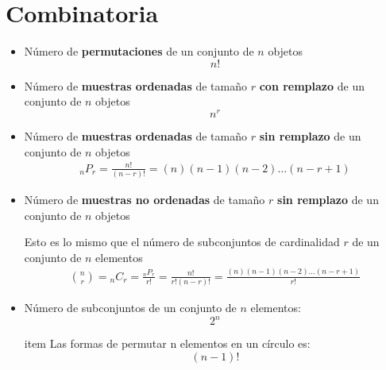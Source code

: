 \documentclass[12pt, fleqn]{report}                             %
\theoremstyle{break}                                            %
\begin{document}
        \section{Combinatoria}

            \begin{itemize}
                \item 
                    Número de \textbf{permutaciones} de un conjunto de $n$ objetos
                    \begin{equation*}
                        n!
                    \end{equation*}

                \item
                    Número de \textbf{muestras ordenadas} de tamaño $r$
                    \textbf{con remplazo} de un conjunto de $n$ objetos
                    \begin{equation*}
                        n^r
                    \end{equation*}

                \item
                    Número de \textbf{muestras ordenadas} de tamaño $r$
                    \textbf{sin remplazo} de un conjunto de $n$ objetos
                    \begin{align*}
                        {}_nP_r
                            = \frac{n!}{(n - r)!}          
                            = (n)(n-1)(n-2)\dots(n-r+1) 
                    \end{align*}

                \item
                    Número de \textbf{muestras no ordenadas} de tamaño $r$
                    \textbf{sin remplazo} de un conjunto de $n$ objetos

                    Esto es lo mismo que el número de subconjuntos de cardinalidad $r$ de
                    un conjunto de $n$ elementos
                    \begin{align*}
                        {n \choose r}
                            = {}_nC_r 
                            = \frac{{}_nP_r}{r!}          
                            = \frac{n!}{r!(n-r)!}          
                            = \frac{(n)(n-1)(n-2)\dots(n-r+1)}{r!}          
                    \end{align*}

                \item
                    Número de subconjuntos de un conjunto de $n$ elementos:
                    \begin{equation*}
                        2^n
                    \end{equation*}

                item
                    Las formas de permutar n elementos en un círculo es:
                    \begin{equation*}
                        (n - 1)!
                    \end{equation*}


            \end{itemize}
\end{document}

